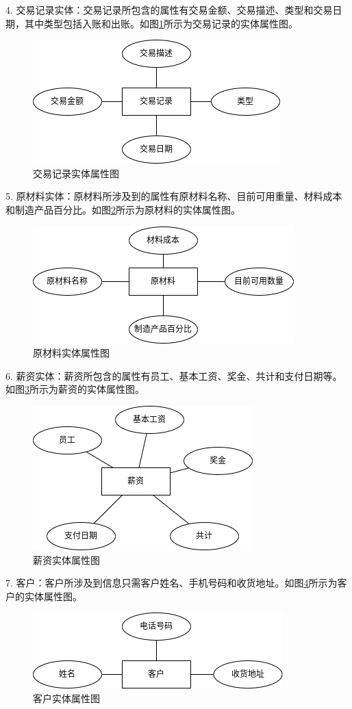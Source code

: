 4. 交易记录实体：交易记录所包含的属性有交易金额、交易描述、类型和交易日期，其中类型包括入账和出账。如图\ref{fig:4tscterf}所示为交易记录的实体属性图。

\begin{figure}[H]
    \centering
    \includegraphics[width=.45\textwidth]{figures/4tscterf.png}
    \caption{交易记录实体属性图}
    \label{fig:4tscterf}
\end{figure}

5. 原材料实体：原材料所涉及到的属性有原材料名称、目前可用重量、材料成本和制造产品百分比。如图\ref{fig:4rmtraerf}所示为原材料的实体属性图。

\begin{figure}[H]
    \centering
    \includegraphics[width=.45\textwidth]{figures/4rmtraerf.png}
    \caption{原材料实体属性图}
    \label{fig:4rmtraerf}
\end{figure}

6. 薪资实体：薪资所包含的属性有员工、基本工资、奖金、共计和支付日期等。如图\ref{fig:4slrerf}所示为薪资的实体属性图。

\begin{figure}[H]
    \centering
    \includegraphics[width=.45\textwidth]{figures/4slrerf.png}
    \caption{薪资实体属性图}
    \label{fig:4slrerf}
\end{figure}

7. 客户：客户所涉及到信息只需客户姓名、手机号码和收货地址。如图\ref{fig:4cstmerf}所示为客户的实体属性图。

\begin{figure}[H]
    \centering
    \includegraphics[width=.45\textwidth]{figures/4cstmerf.png}
    \caption{客户实体属性图}
    \label{fig:4cstmerf}
\end{figure}

